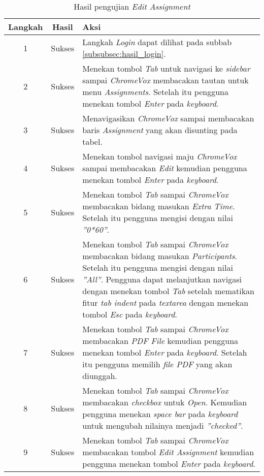 \begin{table}[H]
	\centering
	\caption{Hasil pengujian \textit{Edit Assignment}}
	\label{tab:hasil_edit_assignment}
	\begin{tabular}{|c|c|p{12cm}|}
		\toprule
		Langkah & Hasil & Aksi\\
		\midrule
		1 & Sukses & Langkah \textit{Login} dapat dilihat pada subbab \ref{subsubsec:hasil_login}.\\
		2 & Sukses & Menekan tombol \textit{Tab} untuk navigasi ke \textit{sidebar} sampai \textit{ChromeVox} membacakan tautan untuk menu \textit{Assignments}. Setelah itu pengguna menekan tombol \textit{Enter} pada \textit{keyboard}.\\
		3 & Sukses & Menavigasikan \textit{ChromeVox} sampai membacakan baris \textit{Assignment} yang akan disunting pada tabel.\\
		4 & Sukses & Menekan tombol navigasi maju \textit{ChromeVox} sampai membacakan \textit{Edit} kemudian pengguna menekan tombol \textit{Enter} pada \textit{keyboard}.\\
		5 & Sukses & Menekan tombol \textit{Tab} sampai \textit{ChromeVox} membacakan bidang masukan \textit{Extra Time}. Setelah itu pengguna mengisi dengan nilai \textit{''0*60''}.\\
		6 & Sukses & Menekan tombol \textit{Tab} sampai \textit{ChromeVox} membacakan bidang masukan \textit{Participants}. Setelah itu pengguna mengisi dengan nilai \textit{''All''}. Pengguna dapat melanjutkan navigasi dengan menekan tombol \textit{Tab} setelah mematikan fitur \textit{tab indent} pada \textit{textarea} dengan menekan tombol \textit{Esc} pada \textit{keyboard}.\\
		7 & Sukses & Menekan tombol \textit{Tab} sampai \textit{ChromeVox} membacakan \textit{PDF File} kemudian pengguna menekan tombol \textit{Enter} pada \textit{keyboard}. Setelah itu pengguna memilih \textit{file PDF} yang akan diunggah.\\
		8 & Sukses & Menekan tombol \textit{Tab} sampai \textit{ChromeVox} membacakan \textit{checkbox} untuk \textit{Open}. Kemudian pengguna menekan \textit{space bar} pada \textit{keyboard} untuk mengubah nilainya menjadi \textit{''checked''}.\\
		9 & Sukses & Menekan tombol \textit{Tab} sampai \textit{ChromeVox} membacakan tombol \textit{Edit Assignment} kemudian pengguna menekan tombol \textit{Enter} pada \textit{keyboard}.\\
		\bottomrule
	\end{tabular}
\end{table}

